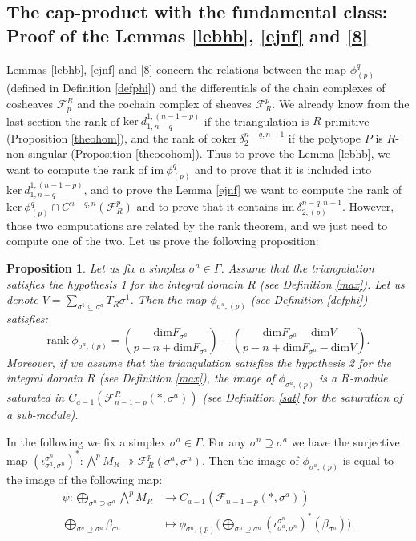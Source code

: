 \documentclass{article}
\newtheorem{proposition}{Proposition}
\begin{document}
\subsection{The cap-product with the fundamental class: Proof of the Lemmas \ref{lebhb}, \ref{ejnf} and \ref{8}}

Lemmas \ref{lebhb}, \ref{ejnf} and \ref{8} concern the relations between the map $\phi^q_{(p)}$ (defined in Definition \ref{defphi}) and the differentials of the chain complexes of cosheaves $\mathcal{F}_p^R$ and the cochain complex of sheaves $\mathcal{F}^p_R$. We already know from the last section the rank of $\mathrm{ker} ~ d^{1,(n-1-p)}_{1,n-q}$ if the triangulation is $R$-primitive (Proposition \ref{theohom}), and the rank of $\mathrm{coker} ~ \delta^{n-q,n-1}_{2}$ if the polytope $P$ is $R$-non-singular (Proposition \ref{theocohom}). Thus to prove the Lemma \ref{lebhb}, we want to compute the rank of $\mathrm{im} ~ \phi^q_{(p)}$ and to prove that it is included into $\mathrm{ker} ~ d^{1,(n-1-p)}_{1,n-q}$, and to prove the Lemma \ref{ejnf} we want to compute the rank of $\mathrm{ker}~ \phi^q_{(p)} \cap C^{n-q,n}(\mathcal{F}^p_R)$ and to prove that it contains $\mathrm{im} ~ \delta^{n-q,n-1}_{2,(p)}$. However, those two computations are related by the rank theorem, and we just need to compute one of the two. Let us prove the following proposition:

\begin{proposition}
    Let us fix a simplex $\sigma^a \in \Gamma$. Assume that the triangulation satisfies the hypothesis 1 for the integral domain $R$ (see Definition \ref{max}). Let us denote $V=\sum_{\sigma^1 \subseteq \sigma^a}T_R \sigma^1$. Then the map $\phi_{\sigma^{a},(p)}$ (see Definition \ref{defphi}) satisfies:
    \begin{equation*}
        \mathrm{rank} ~ \phi_{\sigma^{a},(p)} =\binom{\mathrm{dim}F_{\sigma^a}}{p-n+\mathrm{dim}F_{\sigma^a}}-\binom{\mathrm{dim}F_{\sigma^a}-\mathrm{dim}V}{p-n+\mathrm{dim}F_{\sigma^a}-\mathrm{dim}V}.
    \end{equation*}
    Moreover, if we assume that the triangulation satisfies the hypothesis 2 for the integral domain $R$ (see Definition \ref{max}), the image of $\phi_{\sigma^{a},(p)}$ is a $R$-module saturated in $C_{a-1}(\mathcal{F}_{n-1-p}^R(*,\sigma^a))$ (see Definition \ref{sat} for the saturation of a sub-module).
    \label{ranphi}
\end{proposition}

In the following we fix a simplex $\sigma^a \in \Gamma$. For any $\sigma^n \supseteq \sigma^a$ we have the surjective map $(\iota_{\sigma^a,\sigma^n}^{\sigma^n})^*: \bigwedge^pM_R \twoheadrightarrow \mathcal{F}^p_R(\sigma^a,\sigma^n)$. Then the image of $\phi_{\sigma^{a},(p)}$ is equal to the image of the following map:
\begin{align*}
    \psi:\bigoplus_{\sigma^n \supseteq \sigma^a}\bigwedge^pM_R &\rightarrow  C_{a-1}(\mathcal{F}_{n-1-p}(*,\sigma^a)) \\
    \bigoplus_{\sigma^n \supseteq \sigma^a} \beta_{\sigma^n} & \mapsto \phi_{\sigma^{a},(p)} \Bigg( \bigoplus_{\sigma^n \supseteq \sigma^a} (\iota_{\sigma^a,\sigma^n}^{\sigma^n})^*(\beta_{\sigma^n} ) \Bigg) .
\end{align*}
\end{document}
